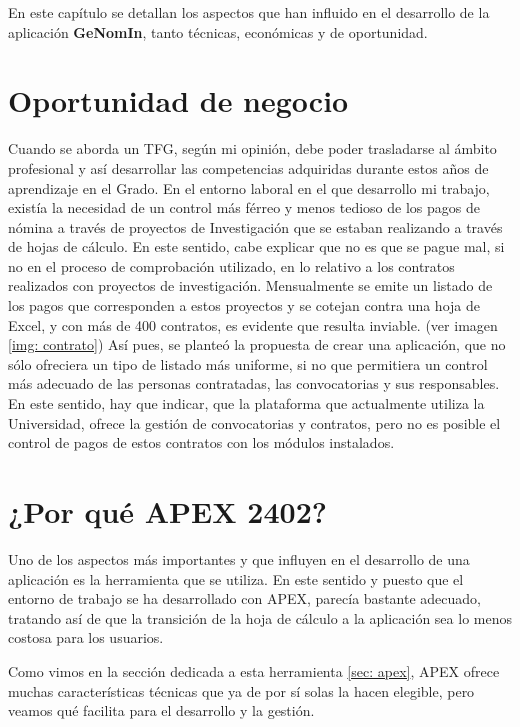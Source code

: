 
En este capítulo se detallan los aspectos que han influido en el desarrollo de la aplicación \textbf{GeNomIn}, tanto técnicas, económicas y de oportunidad.

\section{Oportunidad de negocio}
Cuando se aborda un \acrshort{TFG}, según mi opinión, debe poder trasladarse al ámbito profesional y así desarrollar las competencias adquiridas durante estos años de aprendizaje en el Grado.
En el entorno laboral en el que desarrollo mi trabajo, existía la necesidad de un control más férreo y menos tedioso de los pagos de nómina a través de proyectos de Investigación que se estaban realizando a través de hojas de cálculo. En este sentido, cabe explicar que no es que se pague mal, si no en el proceso de comprobación utilizado, en  lo relativo a los contratos realizados con proyectos de investigación.
Mensualmente se emite un listado de los pagos que corresponden a estos proyectos y se cotejan contra una hoja de Excel, y con más de 400 contratos, es evidente que resulta inviable. (ver imagen \ref{img: contrato})
Así pues, se planteó la propuesta de crear una aplicación, que no sólo ofreciera un tipo de listado más uniforme, si no que permitiera un control más adecuado de las personas contratadas, las convocatorias y sus responsables.
En este sentido, hay que indicar, que la plataforma que actualmente utiliza la Universidad, ofrece la gestión de convocatorias y contratos, pero no es posible el control de pagos de estos contratos con los módulos instalados.

\section{¿Por qué APEX 2402?}
Uno de los aspectos más importantes y que influyen en el desarrollo de una aplicación es la herramienta que se utiliza. En este sentido y puesto que el entorno de trabajo se ha desarrollado con \acrshort{APEX}, parecía bastante adecuado, tratando así de que la transición de la hoja de cálculo a la aplicación sea lo menos costosa para los usuarios.

Como vimos en la sección dedicada a esta herramienta \ref{sec: apex},  \acrshort{APEX} ofrece muchas características técnicas que ya de por sí solas la hacen elegible, pero veamos qué facilita para el desarrollo y la gestión.
